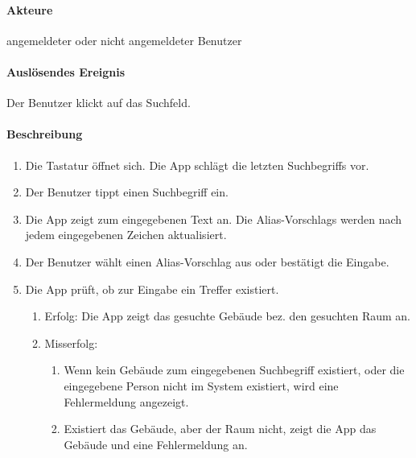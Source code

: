 \paragraph{Akteure}
angemeldeter oder nicht angemeldeter \Gls{Benutzer}
\paragraph{Auslösendes Ereignis}
Der \Gls{Benutzer} klickt auf das \Gls{Suchfeld}.
\paragraph{Beschreibung}
\begin{enumerate}
    \item Die Tastatur öffnet sich. Die App schlägt die letzten \Glspl{Suchbegriff} vor.
    \item Der \Gls{Benutzer} tippt einen \Gls{Suchbegriff} ein.
    \item Die App zeigt  zum eingegebenen Text an. Die \Glspl{Alias-Vorschlag} werden nach jedem eingegebenen Zeichen aktualisiert.
    \item Der \Gls{Benutzer} wählt einen \Gls{Alias-Vorschlag} aus oder bestätigt die Eingabe.
    \item Die App prüft, ob zur Eingabe ein Treffer existiert.
        \begin{enumerate}
            \item{Erfolg:} Die App zeigt das gesuchte Gebäude bez. den gesuchten Raum an.
            \item{Misserfolg:} 
            \begin{enumerate}
                \item Wenn kein Gebäude zum eingegebenen \Gls{Suchbegriff} existiert, oder die eingegebene Person nicht im System existiert, wird eine Fehlermeldung angezeigt.
                \item Existiert das Gebäude, aber der Raum nicht, zeigt die App das Gebäude und eine Fehlermeldung an.
            \end{enumerate}
        \end{enumerate}
\end{enumerate}

